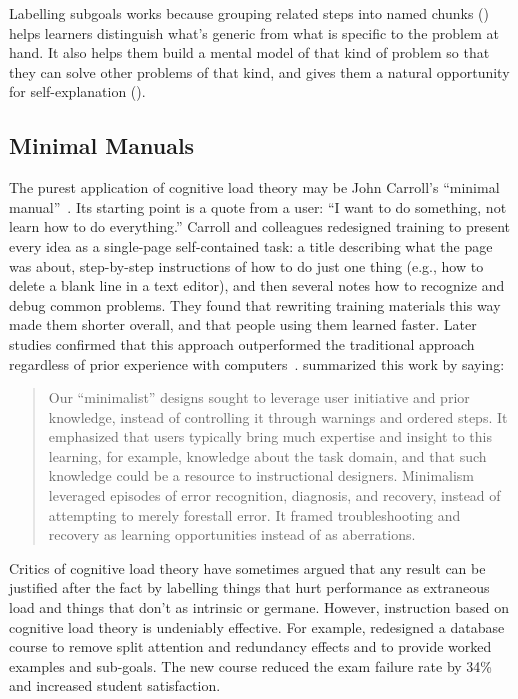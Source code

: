 Labelling subgoals works because grouping related steps into named chunks ()
helps learners distinguish what's generic from what is specific to the problem at hand.
It also helps them build a mental model of that kind of problem
so that they can solve other problems of that kind,
and gives them a natural opportunity for self-explanation ().

\subsection*{Minimal Manuals}

The purest application of cognitive load theory may be John Carroll's ``minimal manual''~\cite{Carr1987,Carr2014}.
Its starting point is a quote from a user:
``I want to do something, not learn how to do everything.''
Carroll and colleagues redesigned training to present every idea as a single-page self-contained task:
a title describing what the page was about,
step-by-step instructions of how to do just one thing
(e.g., how to delete a blank line in a text editor),
and then several notes how to recognize and debug common problems.
They found that rewriting training materials this way made them shorter overall,
and that people using them learned faster.
Later studies confirmed that this approach outperformed the traditional approach
regardless of prior experience with computers~\cite{Lazo1993}.
\cite{Carr2014} summarized this work by saying:

\begin{quote}

  Our ``minimalist'' designs sought to leverage user initiative and prior knowledge,
  instead of controlling it through warnings and ordered steps.
  It emphasized that users typically bring much expertise and insight to this learning,
  for example,
  knowledge about the task domain,
  and that such knowledge could be a resource to instructional designers.
  Minimalism leveraged episodes of error recognition, diagnosis, and recovery,
  instead of attempting to merely forestall error.
  It framed troubleshooting and recovery as learning opportunities instead of as aberrations.

\end{quote}


Critics of cognitive load theory have sometimes argued that
any result can be justified after the fact by labelling things that hurt performance as extraneous load
and things that don't as intrinsic or germane.
However,
instruction based on cognitive load theory is undeniably effective.
For example,
\cite{Maso2016} redesigned a database course to remove split attention and redundancy effects
and to provide worked examples and sub-goals.
The new course reduced the exam failure rate by 34\%
and increased student satisfaction.

